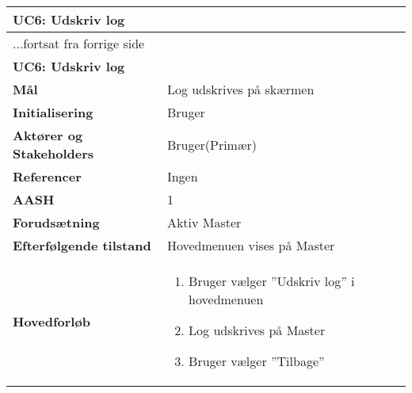 \begin{center} \centering \label{UC6}
	\begin{longtable}{|p{5cm}|p{9cm}|}  %
	\hline
		\multicolumn{2}{|l|}{\textbf{UC6: Udskriv log}} \\\hline %
		\endfirsthead
		
		\multicolumn{2}{l}{...fortsat fra forrige side} \\ \hline %
		\multicolumn{2}{|l|}{\textbf{UC6: Udskriv log}} \\\hline %
		\endhead	
		
		\textbf{Mål}								&Log udskrives på skærmen	\\\hline
		\textbf{Initialisering}					&Bruger 					\\\hline
		\textbf{Aktører og Stakeholders}			&Bruger(Primær)			\\\hline
		\textbf{Referencer}						&Ingen					\\\hline
		\textbf{AASH}							&1						\\\hline
		\textbf{Forudsætning}					&Aktiv Master		\\\hline
		\textbf{Efterfølgende tilstand}			&Hovedmenuen vises på Master	\\\hline
		\textbf{Hovedforløb}					
			&\begin{enumerate}
	
				\item Bruger vælger ''Udskriv log'' i hovedmenuen 
				
				\item Log udskrives på Master
				
				\item Bruger vælger ''Tilbage''
	
			\end{enumerate}\\\hline
	\end{longtable} 
\end{center}


